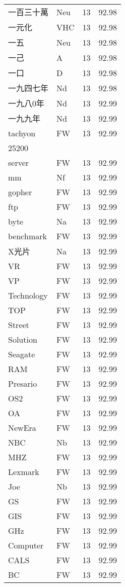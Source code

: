 \documentclass[twocolumn]{book}
\begin{document}
\begin{supertabular}{llrr}
一百三十萬 & Neu & 13 &  92.98\\
一元化 & VHC & 13 &  92.98\\
一五 & Neu & 13 &  92.98\\
一己 & A & 13 &  92.98\\
一口 & D & 13 &  92.98\\
一九四七年 & Nd & 13 &  92.98\\
一九八0年 & Nd & 13 &  92.99\\
一九九年 & Nd & 13 &  92.99\\
tachyon & FW & 13 &  92.99\\
25200\\
server & FW & 13 &  92.99\\
mm & Nf & 13 &  92.99\\
gopher & FW & 13 &  92.99\\
ftp & FW & 13 &  92.99\\
byte & Na & 13 &  92.99\\
benchmark & FW & 13 &  92.99\\
X光片 & Na & 13 &  92.99\\
VR & FW & 13 &  92.99\\
VP & FW & 13 &  92.99\\
Technology & FW & 13 &  92.99\\
TOP & FW & 13 &  92.99\\
Street & FW & 13 &  92.99\\
Solution & FW & 13 &  92.99\\
Seagate & FW & 13 &  92.99\\
RAM & FW & 13 &  92.99\\
Presario & FW & 13 &  92.99\\
OS2 & FW & 13 &  92.99\\
OA & FW & 13 &  92.99\\
NewEra & FW & 13 &  92.99\\
NBC & Nb & 13 &  92.99\\
MHZ & FW & 13 &  92.99\\
Lexmark & FW & 13 &  92.99\\
Joe & Nb & 13 &  92.99\\
GS & FW & 13 &  92.99\\
GIS & FW & 13 &  92.99\\
GHz & FW & 13 &  92.99\\
Computer & FW & 13 &  92.99\\
CALS & FW & 13 &  92.99\\
BC & FW & 13 &  92.99\\

\end{supertabular}
\end{document}
